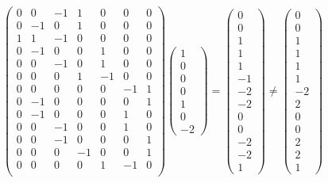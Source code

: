 \[
\begin{pmatrix}
0 & 0 & -1 & 1 & 0 & 0 & 0 \\
 0 & -1 & 0 & 1 & 0 & 0 & 0 \\
 1 & 1 & -1 & 0 & 0 & 0 & 0 \\
 0 & -1 & 0 & 0 & 1 & 0 & 0 \\
 0 & 0 & -1 & 0 & 1 & 0 & 0 \\
 0 & 0 & 0 & 1 & -1 & 0 & 0 \\
 0 & 0 & 0 & 0 & 0 & -1 & 1 \\
 0 & -1 & 0 & 0 & 0 & 0 & 1 \\
 0 & -1 & 0 & 0 & 0 & 1 & 0 \\
 0 & 0 & -1 & 0 & 0 & 1 & 0 \\
 0 & 0 & -1 & 0 & 0 & 0 & 1 \\
 0 & 0 & 0 & -1 & 0 & 0 & 1 \\
 0 & 0 & 0 & 0 & 1 & -1 & 0 \\
 \end{pmatrix}
\begin{pmatrix}1\\0\\0\\0\\1\\0\\-2\end{pmatrix} =
\begin{pmatrix}0\\0\\1\\1\\1\\-1\\-2\\-2\\0\\0\\-2\\-2\\1\end{pmatrix} \neq
\begin{pmatrix}0\\0\\1\\1\\1\\1\\-2\\2\\0\\0\\2\\2\\1\end{pmatrix}
\]

